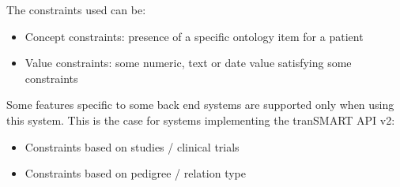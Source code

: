 The constraints used can be:
\begin{itemize}
    \item Concept constraints: presence of a specific ontology item for a patient
    \item Value constraints: some numeric, text or date value satisfying some constraints
\end{itemize}

Some features specific to some back end systems are supported only when using this system.
This is the case for systems implementing the tranSMART API v2:
\begin{itemize}
    \item Constraints based on studies / clinical trials
    \item Constraints based on pedigree / relation type
\end{itemize}
